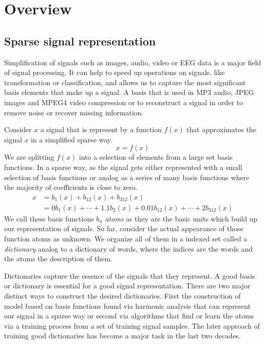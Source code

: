 \chapter{Overview}

\section{Sparse signal representation}
\label{sec:dicts}
Simplification of signals such as images, audio, video or EEG data is a major
field of signal processing. It can help to speed up operations on signals. like
transformation or classification, and allows us to capture the most
significant basis elements that make up a signal. A basis that is
used in MP3 audio, JPEG images and MPEG4 video compression or to reconstruct
a signal in order to remove noise or recover missing information.

Consider $x$ a signal that is represent by a function $f(x)$ that approximates
the signal $x$ in a simplified sparse way.
\begin{equation*}
x = f\left(x\right)
\end{equation*}
We are splitting $f(x)$ into a selection of elements from a large set
basis functions. In a sparse way, as the signal gets either represented with
a small selection of basis functions or analog as a series of many basis
functions where the majority of coefficients is close to zero. 
\begin{equation*}
\begin{split}
x & = b_{1}(x) + b_{12}(x) + b_{312}(x)\\
& = 0b_{1}(x) + \cdots + 1.1b_{2}(x) + 0.01b_{12}(x) + \cdots +
2b_{312}(x)
\end{split}
\end{equation*}
We call these basis functions $b_n$ \emph{atoms} as they are the basic units
which build up our representation of signals. So far, consider the actual
appearance of those function atoms as unknown. We organize all of them in a
indexed set called a \emph{dictionary} analog to a dictionary of words, where
the indices are the words and the atoms the description of them. 

Dictionaries capture the essence of the signals that they represent.
A good basis or dictionary is essential for a good signal representation.
There are two major distinct ways to construct the desired dictionaries. First
the construction of model based on basis functions found via harmonic analysis
that can represent our signal in a sparse way or second via algorithms that find
or learn the atoms via a training process from a set of training signal samples.
The later approach of training good dictionaries has become a major task in the
last two decades\cite{Mairal2010}.


